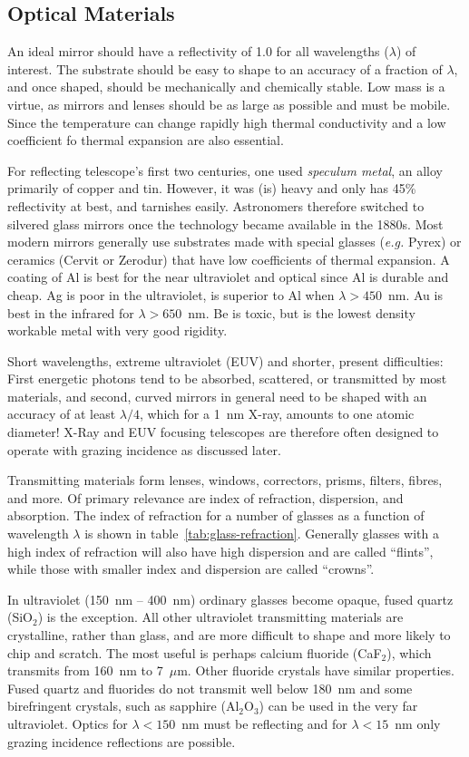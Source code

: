 \subsection{Optical Materials}

An ideal mirror should have a reflectivity of 1.0 for all wavelengths ($\lambda$) of interest. The
substrate should be easy to shape to an accuracy of a fraction of $\lambda$, and once shaped, 
should be mechanically and chemically stable. Low mass is a virtue, as mirrors and lenses should
be as large as possible and must be mobile. Since the temperature can change rapidly high 
thermal conductivity and a low coefficient fo thermal expansion are also essential.

For reflecting telescope's first two centuries, one used {\it speculum metal}, an alloy
primarily of copper and tin. However, it was (is) heavy and only has 45\% reflectivity at best, 
and tarnishes easily. Astronomers therefore switched to silvered glass mirrors once the 
technology became available in the 1880s. Most modern mirrors generally use substrates
made with special glasses ({\it e.g.} Pyrex) or ceramics (Cervit or Zerodur) that have low
coefficients of thermal expansion. A coating of Al is best for the near ultraviolet and optical
since Al is durable and cheap. Ag is poor in the ultraviolet, is superior to Al when 
$\lambda>450$~nm. Au is best in the infrared for $\lambda>650$~nm. Be is toxic, but is the
lowest density workable metal with very good rigidity. 

Short wavelengths, extreme ultraviolet (EUV) and shorter, present
difficulties: First energetic photons tend to be absorbed, scattered,
or transmitted by most materials, and second, curved mirrors in general
need to be shaped with an accuracy of at least $\lambda/4$, which for
a 1~nm X-ray, amounts to one atomic diameter! X-Ray and EUV focusing
telescopes are therefore often designed to operate with grazing
incidence as discussed later.

Transmitting materials form lenses, windows, correctors, prisms, filters, fibres, and more. Of
primary relevance are index of refraction, dispersion, and absorption. The index of refraction for
a number of glasses as a function of wavelength $\lambda$ is shown in table~\ref{tab:glass-refraction}. Generally glasses with a high index of refraction will also have high dispersion and are called ``flints'', while those with smaller index and dispersion are 
called ``crowns''. 

In ultraviolet (150~nm -- 400~nm) ordinary glasses become opaque, fused quartz (SiO$_2$) is
the exception. All other ultraviolet transmitting materials are crystalline, rather than glass, and
are more difficult to shape and more likely to chip and scratch. The most useful is perhaps
calcium fluoride (CaF$_2$), which transmits from 160~nm to 7~$\mu$m. Other fluoride crystals
have similar properties. Fused quartz and fluorides do not transmit well below 180~nm and some
birefringent crystals, such as sapphire (Al$_2$O$_3$) can be used in the very far ultraviolet.
Optics for $\lambda < 150$~nm must be reflecting and for $\lambda < 15$~nm only grazing
incidence reflections are possible.

